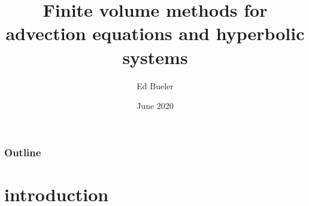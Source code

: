 \documentclass[10pt,hyperref]{beamer}
\title[Finite volume methods]{Finite volume methods for \\ advection equations and hyperbolic systems}
\author{Ed Bueler}
\institute[UAF]{University of Alaska Fairbanks}
\date{June 2020}
\begin{document}
\beamertemplatenavigationsymbolsempty

\begin{frame}
  \maketitle
\end{frame}

\begin{frame}
  \frametitle{Outline}
  \tableofcontents[hideallsubsections]
\end{frame}



\section{introduction}
\end{document}
